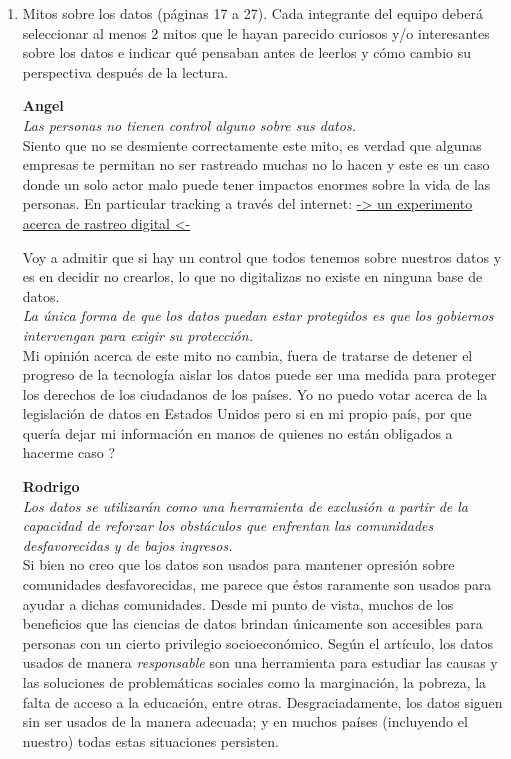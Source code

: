 \documentclass[12pt,a4paper]{article}
\begin{document}
\begin{enumerate}
\begin{enumerate}
				
				

			\item Mitos sobre los datos (páginas 17 a 27). Cada integrante del equipo deberá seleccionar al menos 2
				mitos que le hayan parecido curiosos y/o interesantes sobre los datos e indicar qué pensaban antes de
				leerlos y cómo cambio su perspectiva después de la lectura.

				\textbf{Angel}\\
				\textit{Las personas no tienen control alguno sobre sus datos.}\\

				Siento que no se desmiente correctamente este
				mito, es verdad que algunas empresas te permitan
				no ser rastreado muchas no lo hacen y este es
				un caso donde un solo actor malo
				puede tener impactos enormes sobre la vida de
				las personas. En particular tracking
				a través del internet: \href{https://coveryourtracks.eff.org/}{-> un experimento acerca de rastreo digital <-}

				Voy a admitir que si hay un control que todos
				tenemos sobre nuestros datos y es en decidir no
				crearlos, lo que no digitalizas no existe
				en ninguna base de datos.\\

				\textit{La única forma de que los datos puedan estar protegidos es que
				los gobiernos intervengan para exigir su protección.}\\

				Mi opinión acerca de este mito no cambia,
				fuera de tratarse de detener el progreso de la tecnología
				aislar los datos puede ser una medida para proteger los
				derechos de los ciudadanos de los países.
				Yo no puedo votar acerca de la legislación de datos
				en Estados Unidos pero si en mi propio país, por que
				quería dejar mi información en manos de quienes no
				están obligados a hacerme caso ?
				
				\textbf{Rodrigo}\\
				\textit {Los datos se utilizarán como una herramienta de exclusión a 
				partir de la capacidad de reforzar los obstáculos que enfrentan 
				las comunidades desfavorecidas y de bajos ingresos.} \\
				
				Si bien no creo que los datos son usados para mantener opresión sobre 
				comunidades desfavorecidas, me parece que éstos raramente son usados para
				ayudar a dichas comunidades. Desde mi punto de vista, muchos de los beneficios 
				que las ciencias de datos brindan únicamente son accesibles para personas con un 
				cierto privilegio socioeconómico. Según el artículo, los datos usados de manera 
				\textit{responsable} son una herramienta para estudiar las causas y las soluciones 
				de problemáticas sociales como la marginación, la pobreza, la falta de acceso a la educación,
				entre otras. Desgraciadamente, los datos siguen sin ser usados de la manera adecuada; 
				y en muchos países (incluyendo el nuestro) todas estas situaciones persisten. \\
				

\end{enumerate}
\end{enumerate}
\end{document}
